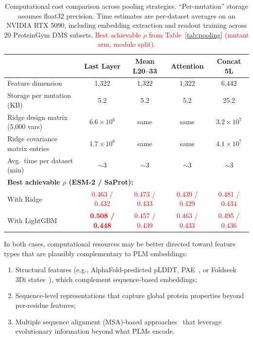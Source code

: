 \documentclass[numbered,webpdf,modern,large]{oup-authoring-template}
\newcommand{\rev}[1]{\textcolor{red}{#1}}
\begin{document}
\begin{table}[ht]
\centering
\caption{Computational cost comparison across pooling strategies.
``Per-mutation'' storage assumes float32 precision. Time estimates are
per-dataset averages on an NVIDIA RTX 5090, including embedding extraction
and readout training across 20 ProteinGym DMS subsets.
\rev{Best achievable $\rho$ from Table~\ref{tab:pooling} (mutant arm,
modulo split).}}
\label{tab:cost}
\begin{tabular}{lcccc}
\toprule
& Last Layer & Mean L20--33 & Attention & Concat 5L \\
\midrule
Feature dimension                  & 1,322 & 1,322 & 1,322 & 6,442 \\
Storage per mutation (KB)          & 5.2   & 5.2   & 5.2   & 25.2 \\
Ridge design matrix (5,000 vars)   & $6.6 \times 10^6$ & same & same & $3.2 \times 10^7$ \\
Ridge covariance matrix entries    & $1.7 \times 10^6$ & same & same & $4.1 \times 10^7$ \\
Avg.\ time per dataset (min)       & $\sim$3 & $\sim$3 & $\sim$3 & $\sim$3 \\
\midrule
\multicolumn{5}{l}{\small \textbf{Best achievable $\rho$ (ESM-2 / SaProt):}} \\
\quad With Ridge                    & \rev{0.463 / 0.432} & \rev{0.473 / 0.433} & \rev{0.439 / 0.429} & \rev{0.481 / 0.434} \\
\quad With LightGBM                 & \textbf{\rev{0.508 / 0.448}} & \rev{0.457 / 0.439} & \rev{0.463 / 0.433} & \rev{0.495 / 0.436} \\
\bottomrule
\end{tabular}
\end{table}

In both cases, computational resources may be better directed toward feature types
that are plausibly complementary to PLM embeddings:
\begin{enumerate}
    \item Structural features (e.g., AlphaFold-predicted pLDDT, PAE~\cite{jumper2021alphafold},
          or Foldseek 3Di states~\cite{vankempen2024foldseek}), which complement
          sequence-based embeddings;
    \item Sequence-level representations that capture global protein properties
          beyond per-residue features;
    \item Multiple sequence alignment (MSA)-based approaches~\cite{riesselman2018deepsequence,
          hopf2017mutation} that leverage evolutionary information beyond what PLMs encode.
\end{enumerate}
\end{document}
